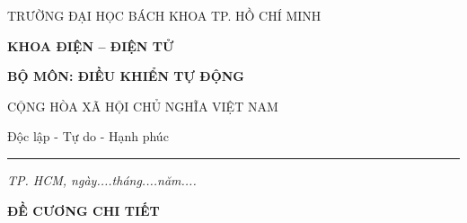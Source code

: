 \clearpage
{}
\thispagestyle{empty}
\begingroup
\pagestyle{empty}
\setlength{\parindent}{0pt}
\setlength{\parskip}{0pt}
\fontsize{12}{16}\selectfont
\let\decuongitemize\itemize
\renewcommand{\itemize}{\decuongitemize
  \setlength{\itemsep}{2pt}
  \setlength{\parsep}{0pt}
  \setlength{\topsep}{4pt}}

\noindent
\begin{minipage}[t]{0.51\textwidth}
  \centering
  {\fontsize{10}{14}\selectfont
  TRƯỜNG ĐẠI HỌC BÁCH KHOA TP. HỒ CHÍ MINH\par}
  \vspace{1mm}
  \textbf{KHOA ĐIỆN -- ĐIỆN TỬ}\par
  \vspace{1mm}
  \textbf{BỘ MÔN: ĐIỀU KHIỂN TỰ ĐỘNG}
\end{minipage}\hfill
\begin{minipage}[t]{0.47\textwidth}
  \centering
  {\fontsize{10}{14}\selectfont
  CỘNG HÒA XÃ HỘI CHỦ NGHĨA VIỆT NAM\par
  \vspace{1mm}
  Độc lập - Tự do - Hạnh phúc\par
  \rule{0.6\linewidth}{0.4pt}\par} 
  \vspace{4mm}
  {\fontsize{10}{14}\selectfont\itshape
  TP. HCM, ngày....tháng....năm....}
\end{minipage}

\vspace{5mm}
\begin{center}
  \textbf{ĐỀ CƯƠNG CHI TIẾT}
\end{center}
\vspace{1mm}

